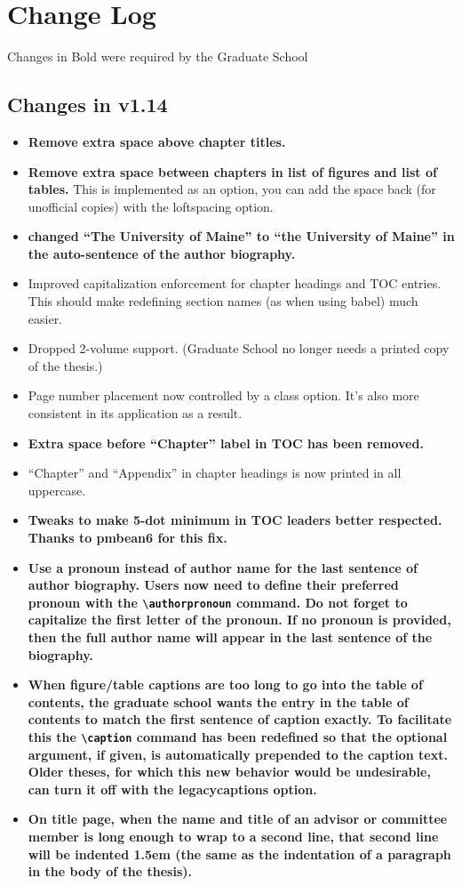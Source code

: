 \chapter{Change Log}
Changes in Bold were required by the Graduate School

\section{Changes in v1.14}
\begin{itemize}
\item{\bfseries Remove extra space above chapter titles.}
\item{{\bfseries Remove extra space between chapters in list of figures and list of tables.} This is implemented as an option, you can add the space back (for unofficial copies) with the loftspacing option.}
\item{\bfseries changed ``The University of Maine'' to ``the University of Maine'' in the auto-sentence of the author biography.}
\item{Improved capitalization enforcement for chapter headings and TOC entries.  This should make redefining section names (as when using babel) much easier.}
\item{Dropped 2-volume support. (Graduate School no longer needs a printed copy of the thesis.)}
\item{Page number placement now controlled by a class option.  It's also more consistent in its application as a result.}
\item{\bfseries Extra space before ``Chapter'' label in TOC has been removed.}
\item{``Chapter'' and ``Appendix'' in chapter headings is now printed in all uppercase.}
\item{\bfseries Tweaks to make 5-dot minimum in TOC leaders better respected.  Thanks to pmbean6 for this fix.}
\item{\bfseries Use a pronoun instead of author name for the last sentence of author biography.  Users now need to define their preferred pronoun with the \verb=\authorpronoun= command.  Do not forget to capitalize the first letter of the pronoun.  If no pronoun is provided, then the full author name will appear in the last sentence of the biography.}
\item{\bfseries When figure/table captions are too long to go into the table of contents, the graduate school wants the entry in the table of contents to match the first sentence of caption exactly.  To facilitate this the \verb=\caption= command has been redefined so that the optional argument, if given, is automatically prepended to the caption text.  Older theses, for which this new behavior would be undesirable, can turn it off with the legacycaptions option.}
\item{\bfseries On title page, when the name and title of an advisor or committee member is long enough to wrap to a second line, that second line will be indented 1.5em (the same as the indentation of a paragraph in the body of the thesis).}
\end{itemize}

